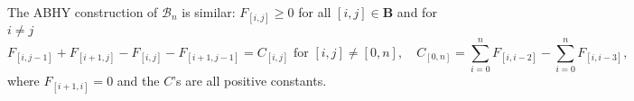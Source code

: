 \documentclass[hidelinks,12pt]{article}
\begin{document}
The ABHY construction of $\mathscr B_n$ is similar: $F_{[i,j]}\geq 0$ for all $[i,j]\in\mathbf B$ and for $i\neq j$
\begin{equation}\label{abhyB}
F_{[i,j-1]}+F_{[i+1,j]}-F_{[i,j]}-F_{[i+1,j-1]}
	=C_{[i,j]}\,\,\text{for $[i,j]\neq [0,n]$}, \quad C_{[0,n]}=\sum_{i=0}^n F_{[i,i-2]}-\sum_{i=0}^n F_{[i,i-3]},
\end{equation}
where $F_{[i+1,i]}=0$ and the $C$'s are all positive constants. 

\end{document}
